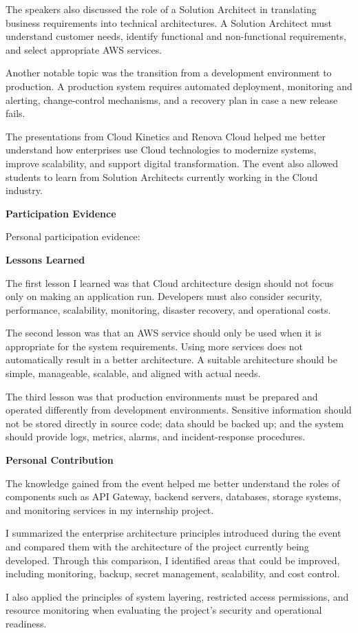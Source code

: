 The speakers also discussed the role of a Solution Architect in
translating business requirements into technical architectures. A
Solution Architect must understand customer needs, identify functional
and non-functional requirements, and select appropriate AWS services.

Another notable topic was the transition from a development environment
to production. A production system requires automated deployment,
monitoring and alerting, change-control mechanisms, and a recovery plan
in case a new release fails.

The presentations from Cloud Kinetics and Renova Cloud helped me better
understand how enterprises use Cloud technologies to modernize systems,
improve scalability, and support digital transformation. The event also
allowed students to learn from Solution Architects currently working in
the Cloud industry.

\vspace{0.5em}\noindent\textbf{Participation Evidence}\par

Personal participation evidence:

\vspace{0.5em}\noindent\textbf{Lessons Learned}\par

The first lesson I learned was that Cloud architecture design should not
focus only on making an application run. Developers must also consider
security, performance, scalability, monitoring, disaster recovery, and
operational costs.

The second lesson was that an AWS service should only be used when it is
appropriate for the system requirements. Using more services does not
automatically result in a better architecture. A suitable architecture
should be simple, manageable, scalable, and aligned with actual needs.

The third lesson was that production environments must be prepared and
operated differently from development environments. Sensitive
information should not be stored directly in source code; data should be
backed up; and the system should provide logs, metrics, alarms, and
incident-response procedures.

\vspace{0.5em}\noindent\textbf{Personal Contribution}\par

The knowledge gained from the event helped me better understand the
roles of components such as API Gateway, backend servers, databases,
storage systems, and monitoring services in my internship project.

I summarized the enterprise architecture principles introduced during
the event and compared them with the architecture of the project
currently being developed. Through this comparison, I identified areas
that could be improved, including monitoring, backup, secret management,
scalability, and cost control.

I also applied the principles of system layering, restricted access
permissions, and resource monitoring when evaluating the project's
security and operational readiness.
